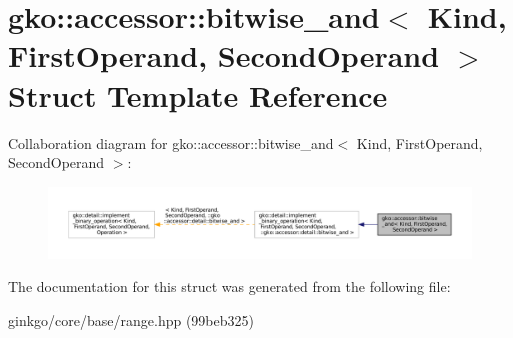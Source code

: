 \hypertarget{structgko_1_1accessor_1_1bitwise__and}{}\section{gko\+:\+:accessor\+:\+:bitwise\+\_\+and$<$ Kind, First\+Operand, Second\+Operand $>$ Struct Template Reference}
\label{structgko_1_1accessor_1_1bitwise__and}


Collaboration diagram for gko\+:\+:accessor\+:\+:bitwise\+\_\+and$<$ Kind, First\+Operand, Second\+Operand $>$\+:
\nopagebreak
\begin{figure}[H]
\begin{center}
\leavevmode
\includegraphics[width=350pt]{structgko_1_1accessor_1_1bitwise__and__coll__graph}
\end{center}
\end{figure}


The documentation for this struct was generated from the following file\+:\begin{DoxyCompactItemize}
\item 
ginkgo/core/base/range.\+hpp (99beb325)\end{DoxyCompactItemize}
